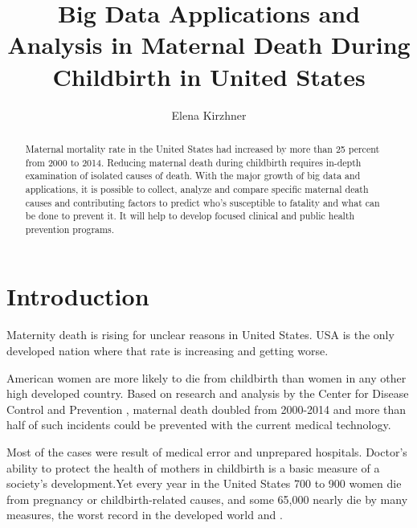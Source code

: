\documentclass[sigconf]{acmart}
\begin{document}
\title{Big Data Applications and Analysis in Maternal Death During Childbirth in United States}


\author{Elena Kirzhner}


\begin{abstract}

Maternal mortality rate in the United States had increased by more than 25 percent from 2000 to 2014. Reducing maternal death during childbirth requires in-depth examination of isolated causes of death. With the major growth of big data and applications, it is possible to collect, analyze and compare specific maternal death causes and contributing factors to predict who's susceptible to fatality and what can be done to prevent it. It will help to develop focused clinical and public health prevention programs.
\end{abstract}


\maketitle

\section{Introduction}

Maternity death is rising for unclear reasons in United States. USA is the only developed nation where that rate is increasing and getting worse.
 
American women are more likely to die from childbirth than women in any other high developed country. Based on research and analysis by the Center for Disease Control and Prevention \cite{bacak2006state}, maternal death doubled from 2000-2014 and more than half of such incidents could be prevented with the current medical technology.

Most of the cases were result of medical error and unprepared hospitals. Doctor’s ability to protect the health of mothers in childbirth is a basic measure of a society’s development.Yet every year in the United States 700 to 900 women die from pregnancy or childbirth-related causes, and some 65,000 nearly die by many measures, the worst record in the developed world \cite{world2012trends} and \cite{amnesty2010deadly}.
\end{document}
